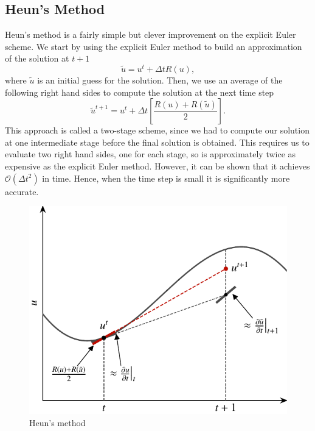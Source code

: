 \subsection{Heun's Method}
Heun's method is a fairly simple but clever improvement on the explicit Euler scheme. We start by using the explicit Euler method to build an approximation of the solution at $t+1$
\begin{equation}
	\tilde{u} = u^t + \Delta t R(u),
\end{equation}
where $\tilde{u}$ is an initial guess for the solution. Then, we use an average of the following right hand sides to compute the solution at the next time step
\begin{equation}
	\tilde{u}^{t+1} = u^t + \Delta t \left[\frac{R(u) + R(\tilde{u})}{2} \right].
\end{equation}
This approach is called a two-stage scheme, since we had to compute our solution at one intermediate stage before the final solution is obtained. This requires us to evaluate two right hand sides, one for each stage, so is approximately twice as expensive as the explicit Euler method. However, it can be shown that it achieves $\mathcal{O}(\Delta t^2)$ in time. Hence, when the time step is small it is significantly more accurate.
\begin{figure}[htbp]
	\centering
	\includegraphics[width=0.6\linewidth]{Pictures/heuns_method}
	\caption{Heun's method}
	\label{fig:heuns_method}
\end{figure}

